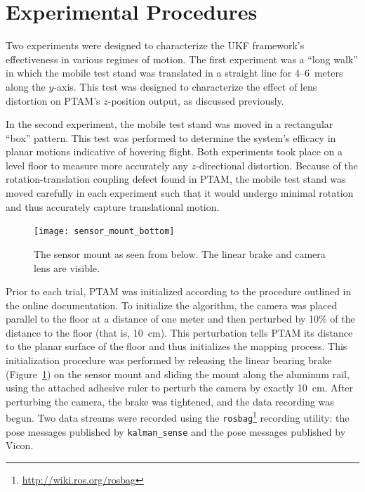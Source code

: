 \section{Experimental Procedures}

Two experiments were designed to characterize the UKF framework's effectiveness in various regimes of motion. The first experiment was a ``long walk'' in which the mobile test stand was translated in a straight line for 4--6~meters along the $y$-axis. This test was designed to characterize the effect of lens distortion on PTAM's $z$-position output, as discussed previously.

In the second experiment, the mobile test stand was moved in a rectangular ``box'' pattern. This test was performed to determine the system's efficacy in planar motions indicative of hovering flight. Both experiments took place on a level floor to measure more accurately any $z$-directional distortion. Because of the rotation-translation coupling defect found in PTAM, the mobile test stand was moved carefully in each experiment such that it would undergo minimal rotation and thus accurately capture translational motion.

\begin{figure}
        \centering
        \texttt{[image: sensor\_mount\_bottom]}
        \caption[Sensor Mount Bottom View]{The sensor mount as seen from below. The linear brake and camera lens are visible.}
        \label{fig:sensor_mount_bottom}
\end{figure}

Prior to each trial, PTAM was initialized according to the procedure outlined in the online documentation. To initialize the algorithm, the camera was placed parallel to the floor at a distance of one meter and then perturbed by 10\% of the distance to the floor (that is, 10~cm). This perturbation tells PTAM its distance to the planar surface of the floor and thus initializes the mapping process. This initialization procedure was performed by releasing the linear bearing brake (Figure~\ref{fig:sensor_mount_bottom}) on the sensor mount and sliding the mount along the aluminum rail, using the attached adhesive ruler to perturb the camera by exactly 10~cm. After perturbing the camera, the brake was tightened, and the data recording was begun. Two data streams were recorded using the \texttt{rosbag}\footnote{\url{http://wiki.ros.org/rosbag}} recording utility: the pose messages published by \texttt{kalman\_sense} and the pose messages published by Vicon.

